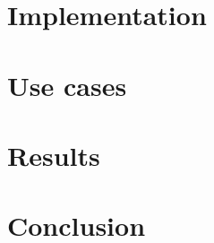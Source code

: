 \documentclass[nocopyrightspace,11pt,preprint]{sigplanconf}
\begin{document}
\twocolumn

\section{Implementation}\label{implementation}


\section{Use cases}


\section{Results}


\section{Conclusion}




\end{document}
